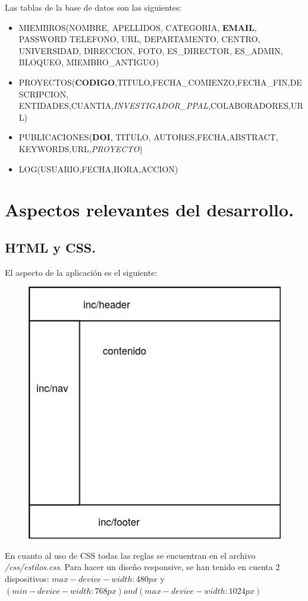 \documentclass[a4paper, 11pt]{article} %
\begin{document}
	
\medskip
Las tablas de la base de datos son las siguientes:
\begin{itemize}
	\item MIEMBROS(NOMBRE, APELLIDOS, CATEGORIA, \textbf{EMAIL}, PASSWORD	TELEFONO, URL, DEPARTAMENTO, CENTRO, UNIVERSIDAD, DIRECCION, FOTO, ES\_DIRECTOR, ES\_ADMIN, BLOQUEO, MIEMBRO\_ANTIGUO) 
	\item PROYECTOS(\textbf{CODIGO},TITULO,FECHA\_COMIENZO,FECHA\_FIN,DESCRIPCION,
	ENTIDADES,CUANTIA,\textit{INVESTIGADOR\_PPAL},COLABORADORES,URL)
	\item PUBLICACIONES(\textbf{DOI}, TITULO, AUTORES,FECHA,ABSTRACT, KEYWORDS,URL,\textit{PROYECTO}) 
	\item LOG(USUARIO,FECHA,HORA,ACCION)
\end{itemize}
\section{Aspectos relevantes del desarrollo.}
\subsection{HTML y CSS.}
El aspecto de la aplicación es el siguiente:
\begin{figure}[H]
	\includegraphics[scale=0.6]{./layout.png}
\end{figure}
En cuanto al uso de CSS todas las reglas se encuentran en el archivo \emph{/css/estilos.css}. Para hacer un diseño responsive, se han tenido en cuenta 2 dispositivos: $max-device-width: 480px$ y $(min-device-width: 768px) and (max-device-width: 1024px)$
\end{document}
